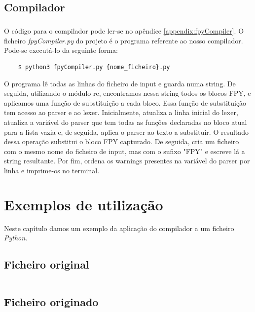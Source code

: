 \documentclass[11pt,a4paper]{report}
\begin{document}
\section{Compilador}
\paragraph*{}
O código para o compilador pode ler-se no apêndice \ref{appendix:fpyCompiler}.
O ficheiro \textit{fpyCompiler.py} do projeto é o programa referente ao nosso compilador. Pode-se executá-lo da seguinte forma:

\begin{verbatim}
    $ python3 fpyCompiler.py {nome_ficheiro}.py
\end{verbatim}

O programa lê todas as linhas do ficheiro de input e guarda numa string.
De seguida, utilizando o módulo re, encontramos nessa string todos os blocos FPY, e aplicamos uma função de substituição a cada bloco. Essa função de substituição tem acesso ao parser e ao lexer. Inicialmente, atualiza a linha inicial do lexer, atualiza a variável do parser que tem todas as funções declaradas no bloco atual para a lista vazia e, de seguida, aplica o parser ao texto a substituir. O resultado dessa operação substitui o bloco FPY capturado. De seguida, cria um ficheiro com o mesmo nome do ficheiro de input, mas com o sufixo "FPY" e escreve lá a string resultante. Por fim, ordena os warnings presentes na variável do parser por linha e imprime-os no terminal.


\chapter{Exemplos de utilização}
Neste capítulo damos um exemplo da aplicação do compilador a um ficheiro \textit{Python}.

\section*{Ficheiro original}
\inputminted[linenos,xleftmargin=16pt, breaklines=true, breakanywhere=true]{python}{Código/exemplo1.py}

\section*{Ficheiro originado}
\inputminted[linenos,xleftmargin=16pt, breaklines=true, breakanywhere=true]{python}{Código/exemplo1FPY.py}
\end{document}
